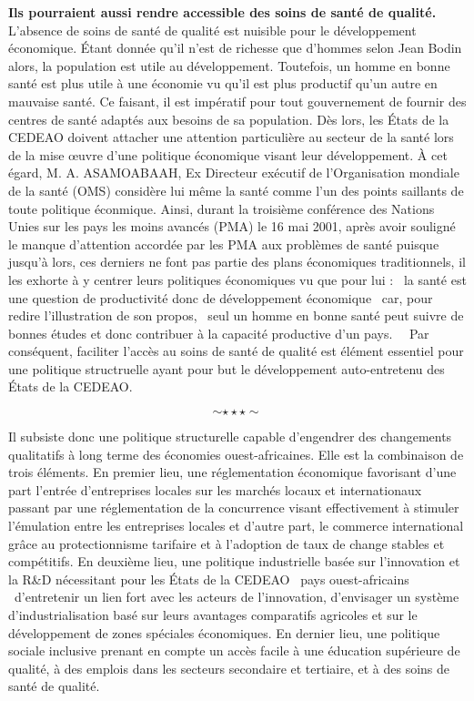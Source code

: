 	 \hspace*{0.5cm}\textbf{Ils pourraient aussi rendre accessible des soins de santé de qualité.} L'absence de soins de santé de qualité est nuisible pour le développement économique. \'Etant donnée qu'il n'est de richesse que d'hommes selon Jean Bodin alors, la population est utile au développement. Toutefois, un homme en bonne santé est plus utile à une économie vu qu'il est plus productif qu'un autre en mauvaise santé. Ce faisant, il est impératif pour tout gouvernement de fournir des centres de santé adaptés aux besoins de sa population. Dès lors, les \'Etats de la CEDEAO doivent attacher une attention particulière au secteur de la santé lors de la mise \oe uvre d'une politique économique visant leur développement. \`A cet égard, M. A. ASAMOABAAH, Ex Directeur exécutif de l'Organisation mondiale de la santé (OMS) considère lui même la santé comme l'un des points saillants de toute politique éconmique. Ainsi, durant la troisième conférence des Nations Unies sur les pays les moins avancés (PMA) le 16 mai 2001, après avoir souligné le manque d'attention accordée par les PMA aux problèmes de santé puisque jusqu'à lors, ces derniers ne font pas partie des plans économiques traditionnels, il les exhorte à y centrer leurs politiques économiques vu que pour lui : \guillemetleft\ la santé est une question de productivité donc de développement économique \guillemetright\ car, pour redire l'illustration de son propos, \guillemetleft\ seul un homme en bonne santé peut suivre de bonnes études et donc contribuer à la capacité productive d'un \mbox{pays. \guillemetright\ } Par conséquent, faciliter l'accès au soins de santé de qualité est élément essentiel pour une politique structruelle ayant pour but le développement auto-entretenu des \'Etats de la CEDEAO.
	 
	 $$\sim\star\star\star\sim$$
	 
	 \hspace*{0.5cm}Il subsiste donc une politique structurelle capable d'engendrer des changements qualitatifs à long terme des économies ouest-africaines. Elle est la combinaison de trois éléments. En premier lieu, une réglementation économique favorisant d'une part l'entrée d'entreprises locales sur les marchés locaux et internationaux passant par une réglementation de la concurrence visant effectivement à stimuler l'émulation entre les entreprises locales et d'autre part, le commerce international grâce au protectionnisme tarifaire et à l'adoption de taux de change stables et compétitifs. En deuxième lieu, une politique industrielle basée sur l'innovation et la R\&D nécessitant pour les \'Etats de la CEDEAO \textendash\ pays ouest-africains \textendash\ d'entretenir un lien fort avec les acteurs de l'innovation, d'envisager un système d'industrialisation basé sur leurs avantages comparatifs agricoles et sur le développement de zones spéciales économiques. En dernier lieu, une politique sociale inclusive prenant en compte un accès facile à une éducation supérieure de qualité, à des emplois dans les secteurs secondaire et tertiaire, et à des soins de santé de qualité.